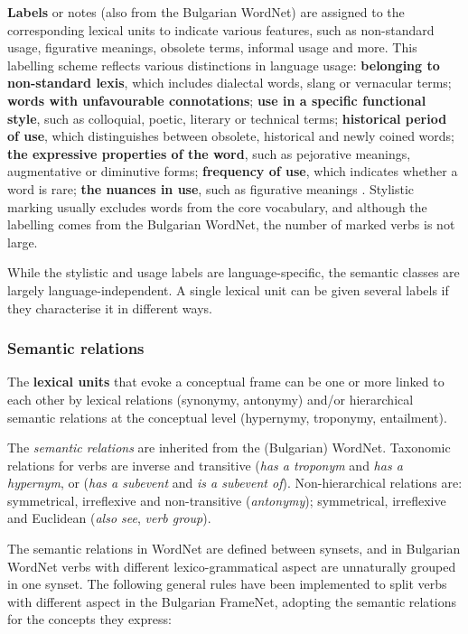 \documentclass[output=paper,colorlinks,citecolor=brown]{langscibook}
\begin{document}
\textbf{Labels} or notes (also from the Bulgarian WordNet) are assigned to the corresponding lexical units to indicate various features, such as non-standard usage, figurative meanings, obsolete terms, informal usage and more. This labelling scheme reflects various distinctions in language usage: \textbf{belonging to non-stan\-dard lexis}, which includes dialectal words, slang or vernacular terms; \textbf{words with unfavourable connotations}; \textbf{use in a specific functional style}, such as colloquial, poetic, literary or technical terms; \textbf{historical period of use}, which distinguishes between obsolete, historical and newly coined words; \textbf{the expressive properties of the word}, such as pejorative meanings, augmentative or diminutive forms; \textbf{frequency of use}, which indicates whether a word is rare; \textbf{the nuances in use}, such as figurative meanings \citep[55]{koeva2021}. Stylistic marking usually excludes words from the core vocabulary, and although the labelling comes from the Bulgarian WordNet, the number of marked verbs is not large.

While the stylistic and usage labels are language-specific, the semantic classes are largely language-independent. A single lexical unit can be given several labels if they characterise it in different ways.

\subsubsection{Semantic relations}

The \textbf{lexical units} that evoke a conceptual frame can be one or more linked to each other by lexical relations (synonymy, antonymy) and/or hierarchical semantic relations at the conceptual level (hypernymy, troponymy, entailment).

The \emph{semantic relations} are inherited from the (Bulgarian) WordNet. Taxonomic relations for verbs are inverse and transitive (\emph{has a troponym} and \emph{has a hypernym}, or (\emph{has a subevent} and \emph{is a subevent of}).
Non-hierarchical relations are: symmetrical, irreflexive and non-transitive (\emph{antonymy}); symmetrical, irreflexive and Euclidean (\emph{also see}, \emph{verb group}). 

The semantic relations in WordNet are defined between synsets, and in Bulgarian WordNet verbs with different lexico-grammatical aspect are unnaturally grouped in one synset. The following general rules have been implemented to split verbs with different  aspect in the Bulgarian FrameNet, adopting the semantic relations for the concepts they express:
\end{document}

